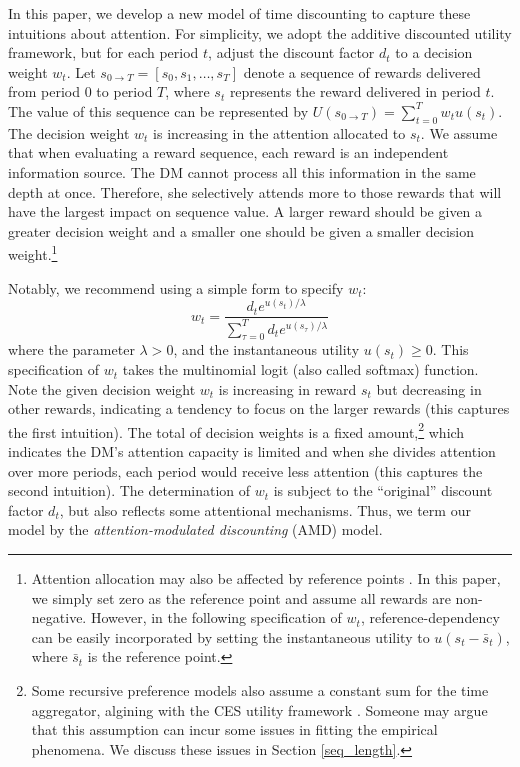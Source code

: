 \documentclass[
  12pt,
]{article}
\begin{document}
In this paper, we develop a new model of time discounting to capture
these intuitions about attention. For simplicity, we adopt the additive
discounted utility framework, but for each period \(t\), adjust the
discount factor \(d_t\) to a decision weight \(w_t\). Let
\(s_{0\rightarrow T}=[s_0,s_1,…,s_T]\) denote a sequence of rewards
delivered from period 0 to period \(T\), where \(s_t\) represents the
reward delivered in period \(t\). The value of this sequence can be
represented by \(U(s_{0\rightarrow T})=\sum_{t=0}^T w_t u(s_t)\). The
decision weight \(w_t\) is increasing in the attention allocated to
\(s_t\). We assume that when evaluating a reward sequence, each reward
is an independent information source. The DM cannot process all this
information in the same depth at once. Therefore, she selectively
attends more to those rewards that will have the largest impact on
sequence value. A larger reward should be given a greater decision
weight and a smaller one should be given a smaller decision
weight.\footnote{Attention allocation may also be affected by reference
  points \citep{bordalo2012salience, kHoszegi2013model}. In this paper,
  we simply set zero as the reference point and assume all rewards are
  non-negative. However, in the following specification of \(w_t\),
  reference-dependency can be easily incorporated by setting the
  instantaneous utility to \(u(s_t-\bar{s}_t)\), where \(\bar{s}_t\) is
  the reference point.}

Notably, we recommend using a simple form to specify \(w_t\):\[
w_t = \frac{d_te^{u(s_t)/\lambda}}{\sum_{\tau=0}^T d_te^{u(s_\tau)/\lambda}}
\]where the parameter \(\lambda>0\), and the instantaneous utility
\(u(s_t)\geq 0\). This specification of \(w_t\) takes the multinomial
logit (also called softmax) function. Note the given decision weight
\(w_t\) is increasing in reward \(s_t\) but decreasing in other rewards,
indicating a tendency to focus on the larger rewards (this captures the
first intuition). The total of decision weights is a fixed
amount,\footnote{Some recursive preference models also assume a constant
  sum for the time aggregator, algining with the CES utility framework
  \citep{epstein1991substitution, weil1990nonexpected}. Someone may
  argue that this assumption can incur some issues in fitting the
  empirical phenomena. We discuss these issues in Section
  \ref{seq_length}.} which indicates the DM's attention capacity is
limited and when she divides attention over more periods, each period
would receive less attention (this captures the second intuition). The
determination of \(w_t\) is subject to the ``original'' discount factor
\(d_t\), but also reflects some attentional mechanisms. Thus, we term
our model by the \emph{attention-modulated discounting} (AMD) model.
\end{document}
